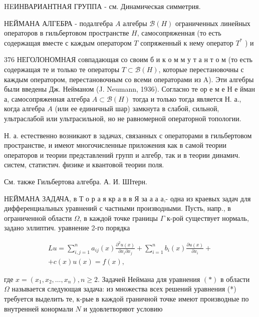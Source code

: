 \documentclass[10pt]{article}
\begin{document}
HEИНВАРИАНТНАЯ ГРУППА - см. Динамическая симметрия.



НЕЙМАНА АЛГЕБРА - подалгебра $A$ алгебры $\mathscr{B}(H)$ ограниченных линейных операторов в гильбертовом пространстве $H$, самосопряженная (то есть содержащая вместе с каждым оператором $T$ сопряженный к нему оператор $T^{*}$ ) и



376 НЕГОЛОНОМНАЯ совпадающая со своим б и к о м м у т а н т о м (то есть содержащая те и только те операторы $T \subset \mathscr{B}(H)$, которые перестановочны с каждым оператором, перестановочным со всеми операторами из A). Эти алгебры были введены Дж. Нейманом (J. Neumann, 1936). Согласно те ор е м е Н е йман а, самосопряженная алгебра $A \subset \mathscr{B}(H)$ тогда и только тогда является Н. а., когда алгебра $A$ (или ее единичный шар) замкнута в слабой, сильной, ультраслабой или ультрасильной, но не равномерной операторной топологии.



Н. а. естественно возникают в задачах, связанных с операторами в гильбертовом пространстве, и имеют многочисленные приложения как в самой теории операторов и теории представлений групп и алгебр, так и в теории динамич. систем, статистич. физике и квантовой теории поля.



См. также Гильбертова алгебра. А. И. ШІтерн.



НЕЙМАНА ЗАДАЧА, в Т о р а я кр а в в Я за а а а,- одна из краевых задач для дифференциальных уравнений с частными производными. Пусть, напр., в ограниченной области $\Omega$, в каждой точке границы $\Gamma$ к-рой существует нормаль, задано эллиптич. уравнение 2-го порядка



\[

\begin{gathered}

L u=\sum_{i, j=1}^{n} a_{i j}(x) \frac{\partial^{2} u(x)}{\partial x_{i} \partial x_{j}}+\sum_{i=1}^{n} b_{i}(x) \frac{\partial u(x)}{\partial x_{i}}+ \\

+c(x) u(x)=f(x),

\end{gathered}

\]



где $x=\left(x_{1}, x_{2}, \ldots, x_{n}\right), n \geqslant 2$. Задачей Неймана для уравнения $(*)$ в области $\Omega$ называется следующая задача: из множества всех решений уравнения (*) требуется выделить те, к-рые в каждой граничной точке имеют производные по внутренней конормали $N$ и удовлетворяют условию
\end{document}
